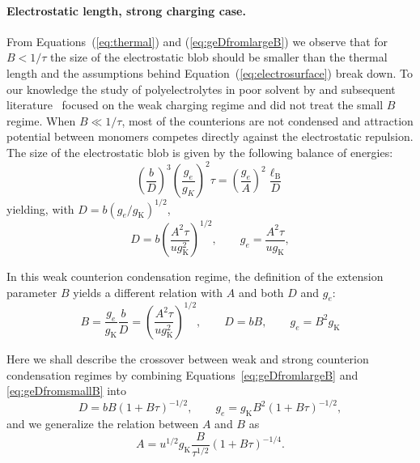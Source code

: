 \documentclass[twoside,twocolumn,9pt]{article}
\begin{document}
\paragraph{Electrostatic length, strong charging case.}
From Equations~(\ref{eq:thermal}) and (\ref{eq:geDfromlargeB}) we observe that for $B<1/\tau$ the size of the electrostatic blob should be smaller than the thermal length and the assumptions behind Equation~(\ref{eq:electrosurface}) break down. To our knowledge the study of polyelectrolytes in poor solvent by \citet{Khokhlov1980} and subsequent literature~\cite{Dobrynin1995,Rubinstein1996} focused on the weak charging regime and did not treat the small $B$ regime. When $B\ll 1/\tau$, most of the counterions are not condensed and attraction potential between monomers competes directly against the electrostatic repulsion. The size of the electrostatic blob is given by the following balance of energies:
\begin{equation}
\left(\frac{b}{D}\right)^3\left(\frac{g_e}{g_K}\right)^2 \tau = \left(\frac{g_e}{A}\right)^2 \frac{\ell_\mathrm{B}}{D}
\label{eq:poorelec}
\end{equation}
yielding, with $D = b(g_e/g_\mathrm{K})^{1/2}$,
\begin{equation}
D = b \left(\frac{A^2\tau}{u g_\mathrm{K}^2}\right)^{1/2}, \qquad g_e = \frac{A^2\tau}{u g_\mathrm{K}},
\end{equation}

In this weak counterion condensation regime, the definition of the extension parameter $B$ yields a different relation with $A$ and both $D$ and $g_e$:
\begin{equation}
B = \frac{g_e}{g_\mathrm{K}}\frac{b}{D} = \left(\frac{A^2\tau}{u g_\mathrm{K}^2}\right)^{1/2}, \qquad D = bB, \qquad g_e = B^2 g_\mathrm{K}
\label{eq:geDfromsmallB}
\end{equation}

Here we shall describe the crossover between weak and strong counterion condensation regimes by combining Equations~\eqref{eq:geDfromlargeB} and \eqref{eq:geDfromsmallB} into
\begin{equation}
D = bB (1+B\tau)^{-1/2}, \qquad
g_e = g_\mathrm{K} B^2 (1+B\tau)^{-1/2},
\label{eq:geDfromB}
\end{equation}
and we generalize the relation between $A$ and $B$ as
\begin{equation}
A = u^{1/2} g_\mathrm{K} \frac{B}{\tau^{1/2}}(1+B\tau)^{-1/4}.
\label{eq:A}
\end{equation}
\end{document}
